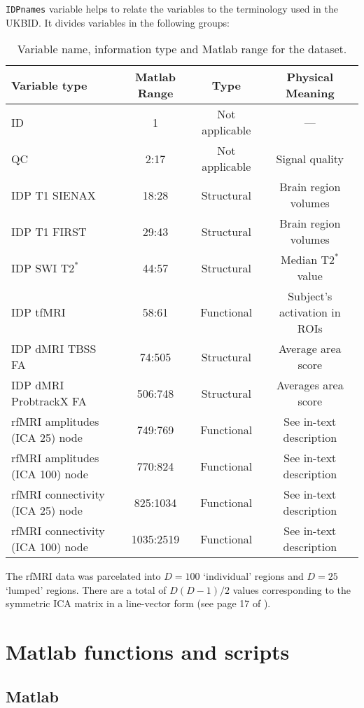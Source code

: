 \documentclass{article}
\begin{document}
{\tt IDPnames} variable helps to relate the variables to the terminology used in the UKBID. It divides variables in the following groups:
\begin{table}
  \centering
  \caption{Variable name, information type and  Matlab range for the dataset.}
  \begin{tabular}{lccc}
    \toprule
    {\bf Variable type} & {\bf Matlab Range} & {\bf Type} &{\bf Physical Meaning}\\
    \midrule
    ID  & 1 & Not applicable & --- \\
    QC  & 2:17 & Not applicable & Signal quality\\
    IDP T1 SIENAX & 18:28 & Structural & Brain region volumes\\
    IDP T1 FIRST & 29:43 & Structural & Brain region volumes\\
    IDP SWI $\text{T2}^{*}$ & 44:57 & Structural & Median $\text{T2}^{*}$ value\\
    IDP tfMRI & 58:61 & Functional & Subject's activation in ROIs\\
    IDP dMRI TBSS FA & 74:505 & Structural &  Average area score\\
    IDP dMRI ProbtrackX FA & 506:748 & Structural & Averages area score\\
    rfMRI amplitudes (ICA 25) node    & 749:769 & Functional & See in-text description\\
    rfMRI amplitudes (ICA 100) node   & 770:824 & Functional & See in-text description\\
    rfMRI connectivity (ICA 25) node  & 825:1034 & Functional & See in-text description\\
    rfMRI connectivity (ICA 100) node & 1035:2519 & Functional &  See in-text description\\
    \bottomrule
  \end{tabular}
  \label{tab:data-ranges}
\end{table}

The rfMRI data was parcelated into $D=100$ `individual' regions and $D=25$ `lumped' regions. There are a total of $D (D-1) / 2$ values corresponding to the symmetric ICA matrix in a line-vector form (see page 17 of \cite{Smith2016}).

\section{Matlab functions and scripts\label{sec:matlab}}

\subsection{Matlab}
\end{document}
